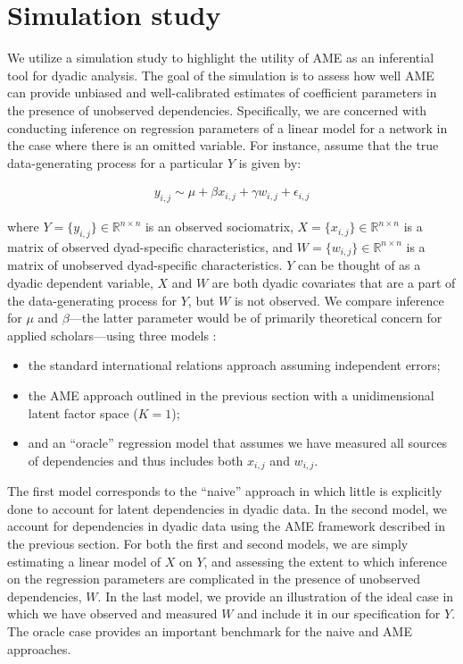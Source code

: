 \section{\textbf{Simulation study}}

We utilize a simulation study to highlight the utility of AME as an inferential tool for dyadic analysis. The goal of the simulation is to assess how well AME can provide unbiased and well-calibrated estimates of coefficient parameters in the presence of unobserved dependencies. Specifically, we are concerned with conducting inference on regression parameters of a linear model for a network in the case where there is an omitted variable. For instance, assume that the true data-generating process for a particular $Y$ is given by:

\begin{align}
	y_{i,j} \sim  \mu + \beta x_{i,j} + \gamma w_{i,j} + \epsilon_{i,j}
	\label{eqn:sim}
\end{align}

where $Y= \{y_{i,j}\}\in \mathbb R^{n\times n}$ is an observed sociomatrix, $X = \{x_{i,j} \} \in \mathbb R^{n \times n}$ is a matrix of observed dyad-specific characteristics, and $W = \{ w_{i,j}\} \in \mathbb R^{n \times n}$ is a matrix of unobserved dyad-specific characteristics. $Y$ can be thought of as a dyadic dependent variable, $X$ and $W$ are both dyadic covariates that are a part of the data-generating process for $Y$, but $W$ is not observed. We compare inference for $\mu$ and $\beta$---the latter parameter would be of primarily theoretical concern for applied scholars---using three models :

\begin{itemize}
	\item the standard international relations approach assuming independent errors; 
	\item the AME approach outlined in the previous section with a unidimensional latent factor space ($K=1$);
	\item and an ``oracle'' regression model that assumes we have measured all sources of dependencies and thus includes both $x_{i,j}$ and $w_{i,j}$. 
\end{itemize}

The first model corresponds to the ``naive'' approach in which little is explicitly done to account for latent dependencies in dyadic data. In the second model, we account for dependencies in dyadic data using the AME framework described in the previous section. For both the first and second models, we are simply estimating a linear model of $X$ on $Y$, and assessing the extent to which inference on the regression parameters are complicated in the presence of unobserved dependencies, $W$. In the last model, we provide an illustration of the ideal case in which we have observed and measured $W$ and include it in our specification for $Y$. The oracle case provides an important benchmark for the naive and AME approaches.

